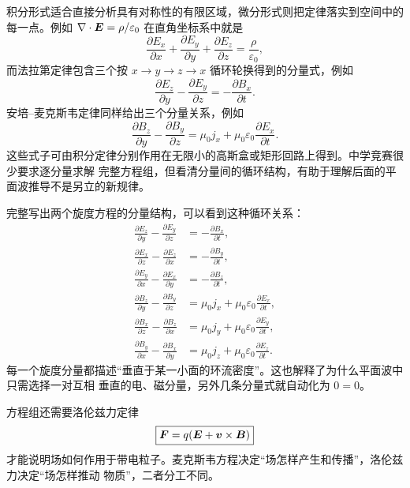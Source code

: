 {积分形式适合直接分析具有对称性的有限区域，微分形式则把定律落实到空间中的每一点。例如
$\nabla\cdot\bm{E}=\rho/\varepsilon_0$ 在直角坐标系中就是
\begin{equation}
  \frac{\partial E_x}{\partial x}+\frac{\partial E_y}{\partial y}
  +\frac{\partial E_z}{\partial z}=\frac{\rho}{\varepsilon_0},
\end{equation}
而法拉第定律包含三个按 $x\to y\to z\to x$ 循环轮换得到的分量式，例如
\begin{equation}
  \frac{\partial E_z}{\partial y}-\frac{\partial E_y}{\partial z}
  =-\frac{\partial B_x}{\partial t}.
\end{equation}
安培--麦克斯韦定律同样给出三个分量关系，例如
\begin{equation}
  \frac{\partial B_z}{\partial y}-\frac{\partial B_y}{\partial z}
  =\mu_0j_x+\mu_0\varepsilon_0\frac{\partial E_x}{\partial t}.
\end{equation}
这些式子可由积分定律分别作用在无限小的高斯盒或矩形回路上得到。中学竞赛很少要求逐分量求解
完整方程组，但看清分量间的循环结构，有助于理解后面的平面波推导不是另立的新规律。

完整写出两个旋度方程的分量结构，可以看到这种循环关系：
\begin{align}
 \frac{\partial E_z}{\partial y}-\frac{\partial E_y}{\partial z}
   &=-\frac{\partial B_x}{\partial t},\\
 \frac{\partial E_x}{\partial z}-\frac{\partial E_z}{\partial x}
   &=-\frac{\partial B_y}{\partial t},\\
 \frac{\partial E_y}{\partial x}-\frac{\partial E_x}{\partial y}
   &=-\frac{\partial B_z}{\partial t},\\
 \frac{\partial B_z}{\partial y}-\frac{\partial B_y}{\partial z}
   &=\mu_0j_x+\mu_0\varepsilon_0\frac{\partial E_x}{\partial t},\\
 \frac{\partial B_x}{\partial z}-\frac{\partial B_z}{\partial x}
   &=\mu_0j_y+\mu_0\varepsilon_0\frac{\partial E_y}{\partial t},\\
 \frac{\partial B_y}{\partial x}-\frac{\partial B_x}{\partial y}
   &=\mu_0j_z+\mu_0\varepsilon_0\frac{\partial E_z}{\partial t}.
\end{align}
每一个旋度分量都描述“垂直于某一小面的环流密度”。这也解释了为什么平面波中只需选择一对互相
垂直的电、磁分量，另外几条分量式就自动化为 $0=0$。

方程组还需要洛伦兹力定律
\begin{equation}
  \boxed{\bm{F}=q(\bm{E}+\bm{v}\times\bm{B})}
\end{equation}
才能说明场如何作用于带电粒子。麦克斯韦方程决定“场怎样产生和传播”，洛伦兹力决定“场怎样推动
物质”，二者分工不同。

}

